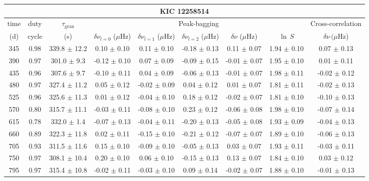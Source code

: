 \documentclass[twocolumn]{aastex61}%
\begin{document}
\begin{table*}[ht]\centering\fontsize{9.}{7.}\selectfont
\begin{tabular}{ccc|ccccc|c}
\multicolumn{9}{c}{KIC 12258514}\\ \hline\hline
time & duty & $\tau_\text{gran}$ &\multicolumn{5}{c|}{Peak-bagging}&Cross-correlation\\
(d)& cycle & (s)&$\delta\nu_{l=0}$ ($\mu$Hz) & $\delta\nu_{l=1}$ ($\mu$Hz) & $\delta\nu_{l=2}$ ($\mu$Hz) & $\delta\nu$ ($\mu$Hz)& $\ln\,S$ & $\delta\nu\,(\mu$Hz)\\\hline
345 & 0.98 & 339.8 $\pm$ 12.2 & 0.10 $\pm$ 0.10 & 0.11 $\pm$ 0.10 & -0.18 $\pm$ 0.13 & 0.11 $\pm$ 0.07 & 1.94 $\pm$ 0.10 & 0.07 $\pm$ 0.13\\
390 & 0.97 & 301.0 $\pm$ 9.3 & -0.12 $\pm$ 0.10 & 0.07 $\pm$ 0.09 & -0.09 $\pm$ 0.15 & -0.01 $\pm$ 0.07 & 1.95 $\pm$ 0.10 & 0.01 $\pm$ 0.11\\
435 & 0.96 & 307.6 $\pm$ 9.7 & -0.10 $\pm$ 0.11 & 0.04 $\pm$ 0.09 & -0.06 $\pm$ 0.13 & -0.01 $\pm$ 0.07 & 1.98 $\pm$ 0.11 & -0.02 $\pm$ 0.12\\
480 & 0.97 & 327.4 $\pm$ 11.2 & 0.05 $\pm$ 0.12 & -0.02 $\pm$ 0.09 & 0.04 $\pm$ 0.12 & 0.01 $\pm$ 0.07 & 1.81 $\pm$ 0.11 & -0.02 $\pm$ 0.13\\
525 & 0.96 & 325.6 $\pm$ 11.3 & 0.01 $\pm$ 0.12 & -0.04 $\pm$ 0.10 & 0.18 $\pm$ 0.12 & -0.02 $\pm$ 0.07 & 1.81 $\pm$ 0.10 & -0.10 $\pm$ 0.13\\
570 & 0.80 & 315.7 $\pm$ 11.1 & -0.03 $\pm$ 0.11 & -0.08 $\pm$ 0.10 & 0.23 $\pm$ 0.12 & -0.06 $\pm$ 0.08 & 1.98 $\pm$ 0.10 & -0.07 $\pm$ 0.14\\
615 & 0.78 & 332.0 $\pm$ 1.4 & -0.07 $\pm$ 0.13 & -0.04 $\pm$ 0.11 & -0.20 $\pm$ 0.13 & -0.05 $\pm$ 0.08 & 1.93 $\pm$ 0.09 & -0.04 $\pm$ 0.13\\
660 & 0.89 & 322.3 $\pm$ 11.8 & 0.02 $\pm$ 0.11 & -0.15 $\pm$ 0.10 & -0.21 $\pm$ 0.12 & -0.07 $\pm$ 0.07 & 1.89 $\pm$ 0.10 & -0.06 $\pm$ 0.13\\
705 & 0.93 & 311.5 $\pm$ 11.6 & 0.15 $\pm$ 0.10 & -0.09 $\pm$ 0.10 & -0.05 $\pm$ 0.13 & 0.03 $\pm$ 0.07 & 1.93 $\pm$ 0.11 & -0.03 $\pm$ 0.11\\
750 & 0.97 & 308.1 $\pm$ 10.4 & 0.20 $\pm$ 0.10 & 0.06 $\pm$ 0.10 & -0.15 $\pm$ 0.13 & 0.13 $\pm$ 0.07 & 1.84 $\pm$ 0.10 & 0.03 $\pm$ 0.12\\
795 & 0.97 & 315.4 $\pm$ 10.8 & -0.02 $\pm$ 0.11 & -0.03 $\pm$ 0.10 & 0.09 $\pm$ 0.14 & -0.02 $\pm$ 0.07 & 1.88 $\pm$ 0.10 & -0.01 $\pm$ 0.13\\

\end{tabular}
\end{table*}
\end{document}
